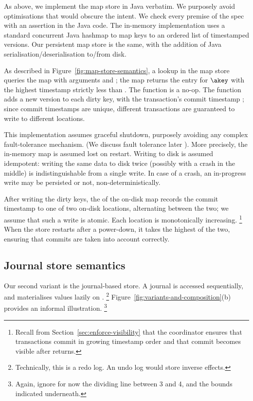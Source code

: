 As above, we implement the map store in Java verbatim.
We purposely avoid optimisations that would obscure the intent.
We check every premise of the spec with an assertion in the Java code.
The in-memory implementation uses a standard concurrent Java hashmap to
map keys to an ordered list of timestamped versions.
Our persistent map store is the same, with the addition of Java
serialisation{\slash}deserialisation to{\slash}from disk.

As described in Figure~\ref{fig:map-store-semantics}, a lookup in the
map store queries the map with arguments \akey{} and \asnpsht{}; the map
returns the entry for $\akey$ with the highest timestamp strictly
less than \asnpsht{}.
The \doUpdate{} function is a no-op.
The \doCommit{} function adds a new version to each dirty key, with the
transaction's commit timestamp \acomstp{}; since commit timestamps are
unique, different transactions are guaranteed to write to different
locations.

This implementation assumes graceful shutdown, purposely avoiding
any complex fault-tolerance mechanism.
(We discuss fault tolerance later ).
More precisely, the in-memory map is assumed lost on
restart.
Writing to disk is assumed idempotent: writing the same data to disk
twice (possibly with a crash in the middle) is indistinguishable from a
single write.
In case of a crash, an in-progress write may be persisted or not,
non-deterministically.

After writing the dirty keys, the \doCommit{} of the on-disk map records
the commit timestamp to one of two on-disk locations, alternating
between the two; we assume that such a write is atomic.
Each location is monotonically increasing.%
%
\footnote{
%
  Recall from Section~\ref{sec:enforce-visibility} that the coordinator
  ensures that transactions commit in growing timestamp order and that
  commit becomes visible after \doCommit{} returns.
}
%
When the store restarts after a power-down, it takes the highest of the
two, ensuring that commits are taken into account correctly.

\subsection{Journal store semantics}

Our second variant is the journal-based store.
A journal is accessed sequentially, and materialises values lazily on
\lookup{}.%
%
\footnote{
%
  Technically, this is a redo log.
  An undo log would store inverse effects.
}
%
Figure~\ref{fig:variants-and-composition}(b) provides an informal
illustration.%
%
\footnote{
%
  Again, ignore for now the dividing line between 3 and 4, and the
  bounds indicated underneath.
}

